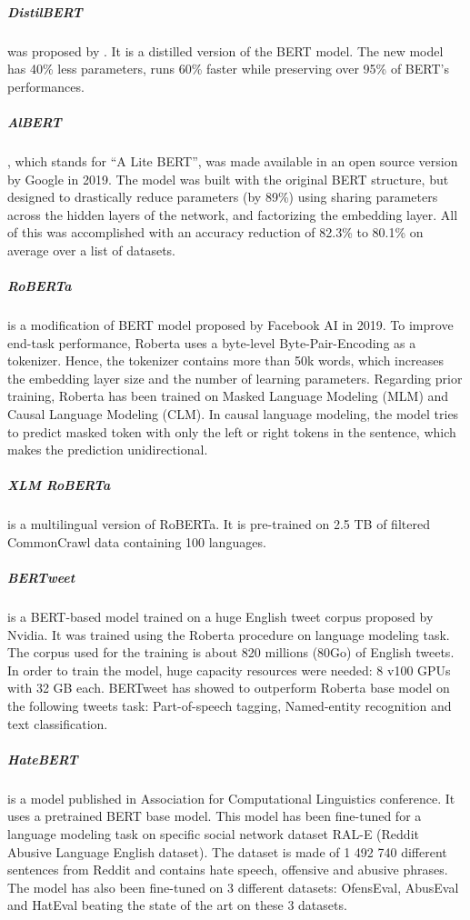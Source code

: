 \documentclass[a4paper,english]{rnti}
\begin{document}
\subparagraph{DistilBERT} was proposed by \citet{39}. It is a distilled \citep{distill} version of the BERT model. The new model has 40\% less parameters, runs 60\% faster while preserving over 95\% of BERT’s performances.

\subparagraph{AlBERT} \citep{38}, which stands for “A Lite BERT”, was made available in an open source version by Google in 2019. The model was built with the original BERT structure, but designed to drastically reduce parameters (by 89\%) using sharing parameters across the hidden layers of the network, and factorizing the embedding layer. All of this was accomplished with an accuracy reduction of 82.3\% to 80.1\% on average over a list of datasets.

\subparagraph{RoBERTa} \citep{37} is a modification of BERT model proposed by Facebook AI in 2019. To improve end-task performance, Roberta uses a byte-level Byte-Pair-Encoding \citep{bytepair_encoding} as a tokenizer. Hence, the tokenizer contains more than 50k words, which increases the embedding layer size and the number of learning parameters. Regarding prior training, Roberta has been trained on Masked Language Modeling (MLM) and Causal Language Modeling (CLM). In causal language modeling, the model tries to predict masked token with only the left or right tokens in the sentence, which makes the prediction unidirectional.

\subparagraph{XLM RoBERTa} \citep{41} is a multilingual version of RoBERTa. It is pre-trained on 2.5 TB of filtered CommonCrawl data containing 100 languages.

\subparagraph{BERTweet} \citep{42} is a BERT-based model trained on a huge English tweet corpus proposed by Nvidia. It was trained using the Roberta procedure on language modeling task. The corpus used for the training is about 820 millions (80Go) of English tweets. In order to train the model, huge capacity resources were needed: 8 v100 GPUs with 32 GB each. BERTweet has showed to outperform Roberta base model on the following tweets task: Part-of-speech tagging, Named-entity recognition and text classification.

\subparagraph{HateBERT} \citep{40} is a model published in Association for Computational Linguistics conference. It uses a pretrained BERT base model. This model has been fine-tuned for a language modeling task on specific social network dataset RAL-E (Reddit Abusive Language English dataset). The dataset is made of 1 492 740 different sentences from Reddit and contains hate speech, offensive and abusive phrases. The model has also been fine-tuned on 3 different datasets: OfensEval, AbusEval and HatEval beating the state of the art on these 3 datasets.
\end{document}
